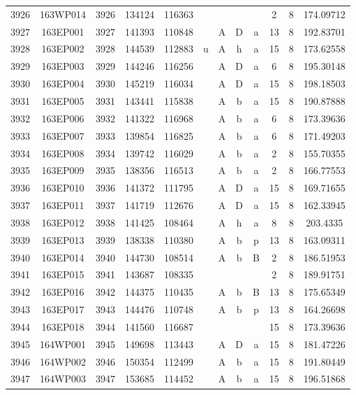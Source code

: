 \begin{tabular}{|*{12}{c|}}
3926 & 163WP014 & 3926 & 134124 & 116363 &  &  &  &  & 2 & 8 & 174.09712 \\ 
3927 & 163EP001 & 3927 & 141393 & 110848 &  & A & D & a & 13 & 8 & 192.83701 \\ 
3928 & 163EP002 & 3928 & 144539 & 112883 & u & A & h & a & 15 & 8 & 173.62558 \\ 
3929 & 163EP003 & 3929 & 144246 & 116256 &  & A & D & a & 6 & 8 & 195.30148 \\ 
3930 & 163EP004 & 3930 & 145219 & 116034 &  & A & D & a & 15 & 8 & 198.18503 \\ 
3931 & 163EP005 & 3931 & 143441 & 115838 &  & A & b & a & 15 & 8 & 190.87888 \\ 
3932 & 163EP006 & 3932 & 141322 & 116968 &  & A & b & a & 6 & 8 & 173.39636 \\ 
3933 & 163EP007 & 3933 & 139854 & 116825 &  & A & b & a & 6 & 8 & 171.49203 \\ 
3934 & 163EP008 & 3934 & 139742 & 116029 &  & A & b & a & 2 & 8 & 155.70355 \\ 
3935 & 163EP009 & 3935 & 138356 & 116513 &  & A & b & a & 2 & 8 & 166.77553 \\ 
3936 & 163EP010 & 3936 & 141372 & 111795 &  & A & D & a & 15 & 8 & 169.71655 \\ 
3937 & 163EP011 & 3937 & 141719 & 112676 &  & A & D & a & 15 & 8 & 162.33945 \\ 
3938 & 163EP012 & 3938 & 141425 & 108464 &  & A & h & a & 8 & 8 & 203.4335 \\ 
3939 & 163EP013 & 3939 & 138338 & 110380 &  & A & b & p & 13 & 8 & 163.09311 \\ 
3940 & 163EP014 & 3940 & 144730 & 108514 &  & A & b & B & 2 & 8 & 186.51953 \\ 
3941 & 163EP015 & 3941 & 143687 & 108335 &  &  &  &  & 2 & 8 & 189.91751 \\ 
3942 & 163EP016 & 3942 & 144375 & 110435 &  & A & b & B & 13 & 8 & 175.65349 \\ 
3943 & 163EP017 & 3943 & 144476 & 110748 &  & A & b & p & 13 & 8 & 164.26698 \\ 
3944 & 163EP018 & 3944 & 141560 & 116687 &  &  &  &  & 15 & 8 & 173.39636 \\ 
3945 & 164WP001 & 3945 & 149698 & 113443 &  & A & D & a & 15 & 8 & 181.47226 \\ 
3946 & 164WP002 & 3946 & 150354 & 112499 &  & A & b & a & 15 & 8 & 191.80449 \\ 
3947 & 164WP003 & 3947 & 153685 & 114452 &  & A & b & a & 15 & 8 & 196.51868 \\ 

\end{tabular}
